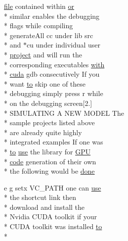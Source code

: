 \begin{DoxyCompactItemize}
\hyperlink{README_8txt_a6f45b2930c1b79b67034355b4701dc56}{file} contained within \hyperlink{userproject_2PoissonIzh__project_2README_8txt_ad4021097ab0ba066271614bf3f4c2e27}{or} \\*
similar enables the debugging \\*
flags while compiling \\*
generate\+All cc under lib src \\*
and $\ast$cu under individual user \\*
\hyperlink{userproject_2SynDelay__project_2README_8txt_a762c750134e07a31b7965860fd292b51}{project} and will run the \\*
corresponding executables \hyperlink{userproject_2OneComp__project_2README_8txt_ace09bb40fbf4457ad9a9340a67a4fa9a}{with} \\*
\hyperlink{README_8txt_a386e5818501e36b046e9cf9ee9a1a6b0}{cuda} gdb consecutively If you \\*
want \hyperlink{README_8txt_add1f2ee32acc15ef77f839d4382c9768}{to} skip one of these \\*
debugging simply press r while \\*
on the debugging screen\mbox{[}2.\mbox{]} \\*
S\+I\+M\+U\+L\+A\+T\+I\+N\+G A N\+E\+W M\+O\+D\+E\+L The \\*
sample projects listed above \\*
are already quite highly \\*
integrated examples If one was \\*
\hyperlink{README_8txt_add1f2ee32acc15ef77f839d4382c9768}{to} \hyperlink{README_8txt_acf386c48a14a2099c9220d6bcde40fc8}{use} the library for \hyperlink{modelSpec_8h_a39cb9803524b6f3b783344b2f89867b4}{G\+P\+U} \\*
\hyperlink{userproject_2MBody__userdef__project_2README_8txt_aeec4e596748e7c29dd5548dae4c70685}{code} generation of their own \\*
the following would be \hyperlink{README_8txt_a65776961365fe8f230a95dab49b0dfa2}{done}
\item 
e g setx V\+C\+\_\+\+P\+A\+T\+H one can \hyperlink{README_8txt_acf386c48a14a2099c9220d6bcde40fc8}{use} \\*
the shortcut link then \\*
download and install the \\*
Nvidia C\+U\+D\+A toolkit if your \\*
C\+U\+D\+A toolkit was installed \hyperlink{README_8txt_add1f2ee32acc15ef77f839d4382c9768}{to} \\*

\end{DoxyCompactItemize}
